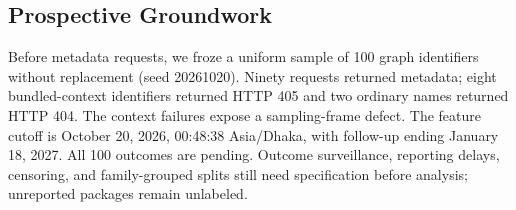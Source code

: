 \subsection{Prospective Groundwork}
Before metadata requests, we froze a uniform sample of 100 graph identifiers without replacement (seed 20261020). Ninety requests returned metadata; eight bundled-context identifiers returned HTTP 405 and two ordinary names returned HTTP 404. The context failures expose a sampling-frame defect. The feature cutoff is October 20, 2026, 00:48:38 Asia/Dhaka, with follow-up ending January 18, 2027. All 100 outcomes are pending. Outcome surveillance, reporting delays, censoring, and family-grouped splits still need specification before analysis; unreported packages remain unlabeled.

